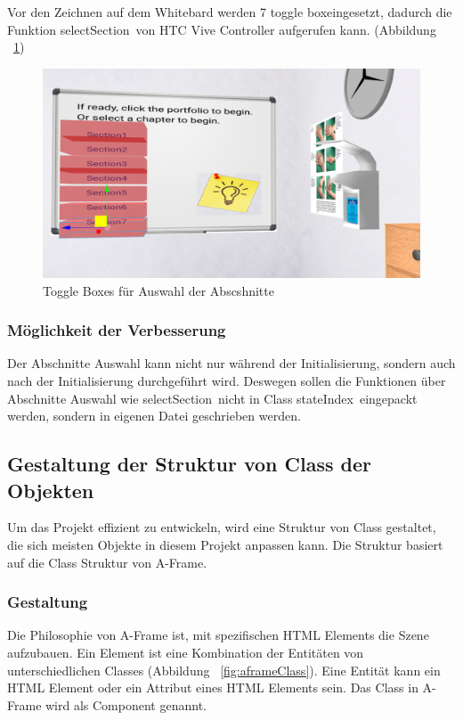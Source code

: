   Vor den Zeichnen auf dem Whitebard werden 7 \glqq toggle box\grqq eingesetzt, dadurch die Funktion \glqq selectSection\grqq\ von HTC Vive Controller aufgerufen kann. (Abbildung ~\ref{fig:toggleBoxAbschnitte})
  
\begin{figure}[ht]
\vspace*{0.3cm}
\centering
\includegraphics[width=\textwidth]{images/toggleBoxAbschnitte.png}
\caption[Toggle Boxes]{Toggle Boxes für Auswahl der Abscshnitte}
\label{fig:toggleBoxAbschnitte} 
\end{figure}
  
  \subsubsection{Möglichkeit der Verbesserung}
  Der Abschnitte Auswahl kann nicht nur während der Initialisierung, sondern auch nach der Initialisierung durchgeführt wird. Deswegen sollen die Funktionen über Abschnitte Auswahl wie \glqq selectSection\grqq\ nicht in Class \glqq stateIndex\grqq\ eingepackt werden, sondern in eigenen Datei geschrieben werden.
  
 \subsection{Gestaltung der Struktur von Class der Objekten}
 Um das Projekt effizient zu entwickeln, wird eine Struktur von Class gestaltet, die sich meisten Objekte in diesem Projekt anpassen kann. Die Struktur basiert auf die Class Struktur von A-Frame.
 
 \subsubsection{Gestaltung}
 Die Philosophie von A-Frame ist, mit spezifischen HTML Elements die Szene aufzubauen. Ein Element ist eine Kombination der Entitäten von unterschiedlichen Classes (Abbildung ~\ref{fig:aframeClass}). Eine Entität kann ein HTML Element oder ein Attribut eines HTML Elements sein. Das Class in A-Frame wird als Component genannt.
 
